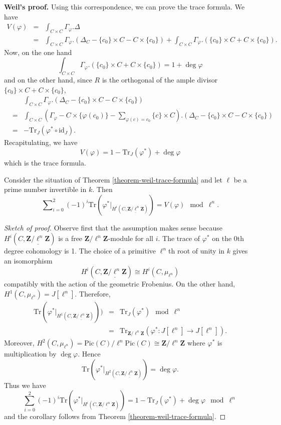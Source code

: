 \medskip\noindent
{\bf Weil's proof.} Using this correspondence, we can prove the trace
formula. We have
\begin{eqnarray*}
V(\varphi) & = & \int_{C \times C} \Gamma_\varphi.\Delta \\
& = & \int_{C \times C} \Gamma_\varphi. \left(\Delta_C - \{c_0\} \times C - C
\times \{c_0\}\right) + \int_{C \times C} \Gamma_\varphi. \left(\{c_0\} \times C
+ C \times \{c_0\}\right).
\end{eqnarray*}
Now, on the one hand
$$
\int_{C \times C} \Gamma_\varphi. \left(\{c_0\} \times C + C \times
\{c_0\}\right)
=
1 + \deg \varphi
$$
and on the other hand, since $R$ is the orthogonal of the ample divisor
$\{c_0\} \times C + C \times \{c_0\}$,
\begin{eqnarray*}
& &
\int_{C \times C} \Gamma_\varphi. \left(\Delta_C - \{c_0\} \times C - C \times
\{c_0\}\right) \\
& = &
\int_{C \times C} \left(\Gamma_\varphi - C \times \{\varphi(c_0)\} -
\sum_{\varphi(c) = c_0} \{c\} \times C \right). \left(\Delta_C - \{c_0\} \times
C - C \times \{c_0\}\right) \\
& = & - \text{Tr}_J (\varphi^* \circ \text{id}_J).
\end{eqnarray*}
Recapitulating, we have
$$
V(\varphi) = 1 - \text{Tr}_J (\varphi^*) + \deg \varphi
$$
which is the trace formula.

\begin{lemma}
\label{lemma-weil-mod}
Consider the situation of
Theorem \ref{theorem-weil-trace-formula}
and let $\ell$ be a prime number invertible in $k$. Then
$$
\sum\nolimits_{i=0}^2
(-1)^i
\text{Tr}(\varphi^* |_{H^i (C, \underline{\mathbf{Z}/\ell^n \mathbf{Z}})})
=
V(\varphi) \mod \ell^n.
$$
\end{lemma}

\begin{proof}[Sketch of proof]
Observe first that the assumption makes sense because $H^i(C,
\underline{\mathbf{Z}/\ell^n \mathbf{Z}})$ is a free $\mathbf{Z}/\ell^n
\mathbf{Z}$-module for all $i$. The trace of $\varphi^*$ on the 0th degree
cohomology is 1. The choice of a primitive $\ell^n$th root of unity in $k$
gives an isomorphism
$$
H^i(C, \underline{\mathbf{Z}/\ell^n \mathbf{Z}}) \cong H^i(C, \mu_{\ell^n})
$$
compatibly with the action of the geometric Frobenius. On the other hand,
$H^1(C, \mu_{\ell^n}) = J[\ell^n]$. Therefore,
\begin{eqnarray*}
\text{Tr}(\varphi^* |_{H^1 (C, \underline{\mathbf{Z}/\ell^n \mathbf{Z}})})) & =
& \text{Tr}_J (\varphi^*) \mod \ell^n \\
& = & \text{Tr}_{\mathbf{Z}/\ell^n \mathbf{Z}} (\varphi^* : J[\ell^n] \to
J[\ell^n]).
\end{eqnarray*}
Moreover, $H^2(C, \mu_{\ell^n}) = \text{Pic}(C)/\ell^n\text{Pic}(C) \cong
\mathbf{Z}/\ell^n \mathbf{Z}$ where $\varphi^*$ is multiplication by $\deg
\varphi$. Hence
$$
\text{Tr} (\varphi^*|_{H^2 (C, \underline{\mathbf{Z}/\ell^n \mathbf{Z}})}) =
\deg \varphi.
$$
Thus we have
$$
\sum_{i=0}^2 (-1)^i \text{Tr}(\varphi^* |_{H^i (C, \underline{\mathbf{Z}/\ell^n
\mathbf{Z}})}) = 1 - \text{Tr}_J(\varphi^*) + \deg \varphi \mod \ell^n
$$
and the corollary follows from Theorem \ref{theorem-weil-trace-formula}.
\end{proof}

